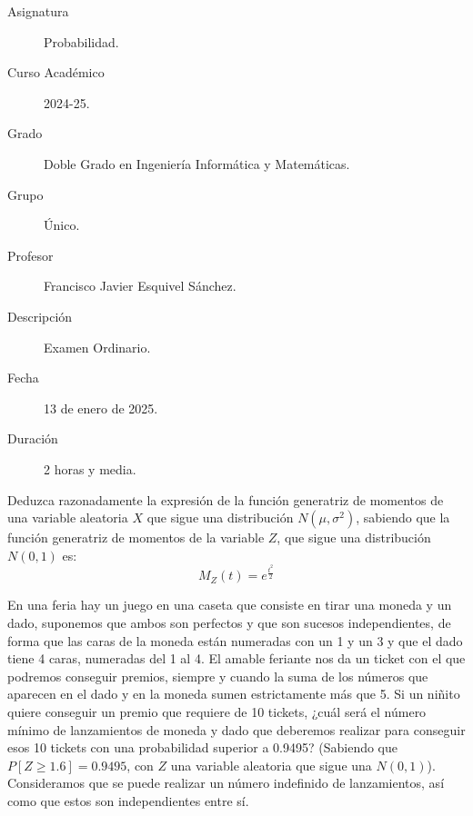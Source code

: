 \documentclass[12pt]{article}
\begin{document}

    
    

    \begin{description}
        \item[Asignatura] Probabilidad.
        \item[Curso Académico] 2024-25.
        \item[Grado] Doble Grado en Ingeniería Informática y Matemáticas.
        \item[Grupo] Único.
        \item[Profesor] Francisco Javier Esquivel Sánchez.
        \item[Descripción] Examen Ordinario. 
        \item[Fecha] 13 de enero de 2025.
        \item[Duración] 2 horas y media.
    
    \end{description}
    \newpage

    \begin{ejercicio}[1 punto]
        Deduzca razonadamente la expresión de la función generatriz de momentos de una variable aleatoria $X$ que sigue una distribución $N(\mu, \sigma^2)$, sabiendo que la función generatriz de momentos de la variable $Z$, que sigue una distribución $N(0,1)$ es:
        \begin{equation*}
            M_Z(t) = e^{\frac{t^2}{2}}
        \end{equation*}
    \end{ejercicio}

    \begin{ejercicio}[2 puntos]
        En una feria hay un juego en una caseta que consiste en tirar una moneda y un dado, suponemos que ambos son perfectos y que son sucesos independientes, de forma que las caras de la moneda están numeradas con un 1 y un 3 y que el dado tiene 4 caras, numeradas del 1 al 4. El amable feriante nos da un ticket con el que podremos conseguir premios, siempre y cuando la suma de los números que aparecen en el dado y en la moneda sumen estrictamente más que 5. Si un niñito quiere conseguir un premio que requiere de 10 tickets, ¿cuál será el número mínimo de lanzamientos de moneda y dado que deberemos realizar para conseguir esos 10 tickets con una probabilidad superior a 0.9495? (Sabiendo que $P[Z\geq 1.6]=0.9495$, con $Z$ una variable aleatoria que sigue una $N(0,1)$). Consideramos que se puede realizar un número indefinido de lanzamientos, así como que estos son independientes entre sí.
    \end{ejercicio}
\end{document}
